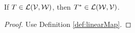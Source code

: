
\begin{lem}
  If $T\in {\cal L}({\cal V},{\cal W})$,
  then $T^*\in {\cal L}({\cal W},{\cal V})$.
\end{lem}
\begin{proof}
  Use Definition \ref{def:linearMap}.
\end{proof}

